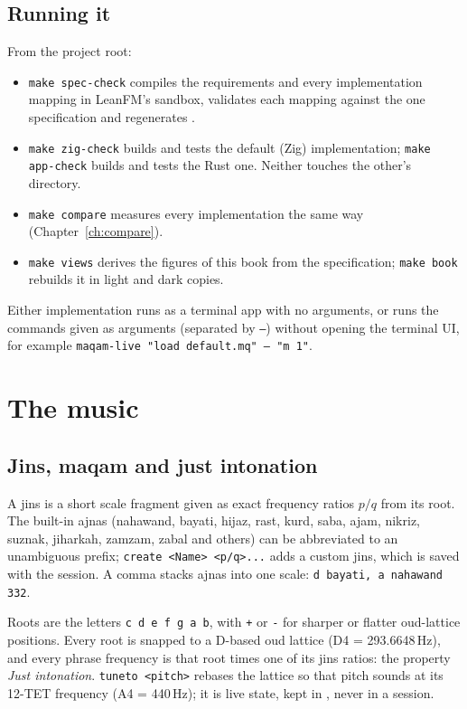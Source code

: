 \documentclass[11pt,oneside]{book}
\newcommand{\cmd}[1]{\texttt{#1}}
\begin{document}
\section{Running it}
From the project root:
\begin{itemize}
  \item \cmd{make spec-check} compiles the requirements and every
  implementation mapping in LeanFM's sandbox, validates each mapping against the
  one specification and regenerates .
  \item \cmd{make zig-check} builds and tests the default (Zig) implementation;
  \cmd{make app-check} builds and tests the Rust one. Neither touches the other's
  directory.
  \item \cmd{make compare} measures every implementation the same way
  (Chapter~\ref{ch:compare}).
  \item \cmd{make views} derives the figures of this book from the
  specification; \cmd{make book} rebuilds it in light and dark copies.
\end{itemize}

Either implementation runs as a terminal app with no arguments, or runs the
commands given as arguments (separated by \cmd{--}) without opening the
terminal UI, for example \cmd{maqam-live "load default.mq" -- "m 1"}.

\chapter{The music}
\section{Jins, maqam and just intonation}
A jins is a short scale fragment given as exact frequency ratios $p/q$ from its
root. The built-in ajnas (nahawand, bayati, hijaz, rast, kurd, saba, ajam,
nikriz, suznak, jiharkah, zamzam, zabal and others) can be abbreviated to an
unambiguous prefix; \cmd{create <Name> <p/q>...} adds a custom jins, which is
saved with the session. A comma stacks ajnas into one scale:
\cmd{d bayati, a nahawand 332}.

Roots are the letters \cmd{c d e f g a b}, with \cmd{+} or \cmd{-} for sharper
or flatter oud-lattice positions. Every root is snapped to a D-based oud
lattice (D4 = 293.6648\,Hz), and every phrase frequency is that root times one
of its jins ratios: the property \emph{Just intonation}.
\cmd{tuneto <pitch>} rebases the lattice so that pitch sounds at its 12-TET
frequency (A4 = 440\,Hz); it is live state, kept in , never in
a session.
\end{document}
